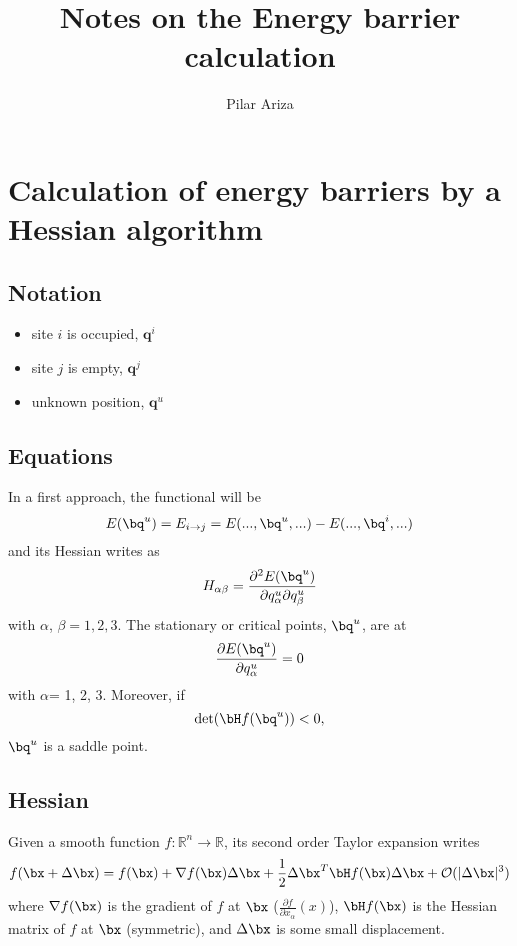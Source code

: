 \documentclass[10pt,a4paper]{article}
\author{Pilar Ariza}
\title{Notes on the Energy barrier calculation}
\begin{document}
\maketitle



\section{Calculation of energy barriers by a Hessian algorithm}

\subsection{Notation}

\begin{itemize}
  \item  site $i$ is occupied, $\mathbf{q}^i$
  \item  site $j$ is empty, $\mathbf{q}^j$
  \item  unknown position, $\mathbf{q}^u$
\end{itemize}

\subsection{Equations}
In a first approach, the functional will be
\begin{equation}
E(\bq^u) = E _{i{\to}j} =E (..., \bq^u, ...) - E (..., \bq^i, ...)
\end{equation}
and its Hessian writes as
\begin{equation}
H_{\alpha \beta}= \frac{\partial ^2 E(\bq^u)}{\partial q^u _{\alpha} \partial q^u _{\beta}}
\end{equation}
with $\alpha$, $\beta = 1, 2, 3$.
The stationary or critical points, $\bq^u$, are at
\begin{equation}
\frac{\partial E(\bq^u)}{\partial q^u _{\alpha}} = 0
\end{equation}
with $\alpha$= 1, 2, 3. Moreover, if
\begin{equation}
\det(\bH f(\bq^u))<0,
\end{equation}
$\bq^u$ is a saddle point.

\subsection{Hessian}
Given a smooth function $f : \mathbb{R}^n \rightarrow \mathbb{R}$, its second order Taylor expansion writes
\begin{equation}
f(\bx + \Delta \bx)=f(\bx)+\mathbf{\nabla} f(\bx) \Delta \bx+\frac{1}{2} \Delta \bx^T \bH f(\bx) \Delta \bx + \mathcal{O}(|\Delta \bx|^3)
\end{equation}
where $\mathbf{\nabla} f(\bx)$ is the gradient of $f$ at $\bx$ ($\frac{\partial f}{\partial x _{\alpha}} (x)$), $\bH f(\bx)$ is the Hessian matrix of $f$ at $\bx$ (symmetric), and $\Delta \bx$ is some small displacement.
\end{document}
